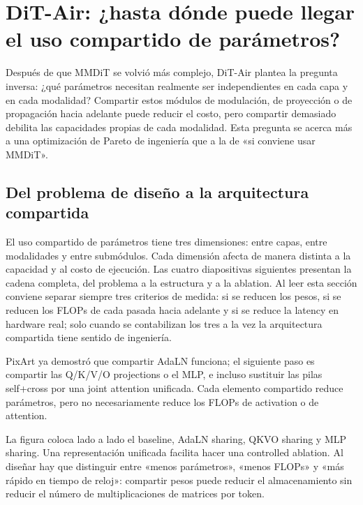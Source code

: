 \section{DiT-Air: ¿hasta dónde puede llegar el uso compartido de parámetros?}

Después de que MMDiT se volvió más complejo, DiT-Air plantea la pregunta inversa: ¿qué parámetros necesitan realmente ser independientes en cada capa y en cada modalidad? Compartir estos módulos de modulación, de proyección o de propagación hacia adelante puede reducir el costo, pero compartir demasiado debilita las capacidades propias de cada modalidad. Esta pregunta se acerca más a una optimización de Pareto de ingeniería que a la de «si conviene usar MMDiT».

\subsection{Del problema de diseño a la arquitectura compartida}

El uso compartido de parámetros tiene tres dimensiones: entre capas, entre modalidades y entre submódulos. Cada dimensión afecta de manera distinta a la capacidad y al costo de ejecución. Las cuatro diapositivas siguientes presentan la cadena completa, del problema a la estructura y a la ablation. Al leer esta sección conviene separar siempre tres criterios de medida: si se reducen los pesos, si se reducen los FLOPs de cada pasada hacia adelante y si se reduce la latency en hardware real; solo cuando se contabilizan los tres a la vez la arquitectura compartida tiene sentido de ingeniería.


PixArt ya demostró que compartir AdaLN funciona; el siguiente paso es compartir las Q/K/V/O projections o el MLP, e incluso sustituir las pilas self+cross por una joint attention unificada. Cada elemento compartido reduce parámetros, pero no necesariamente reduce los FLOPs de activation o de attention.


La figura coloca lado a lado el baseline, AdaLN sharing, QKVO sharing y MLP sharing. Una representación unificada facilita hacer una controlled ablation. Al diseñar hay que distinguir entre «menos parámetros», «menos FLOPs» y «más rápido en tiempo de reloj»: compartir pesos puede reducir el almacenamiento sin reducir el número de multiplicaciones de matrices por token.

